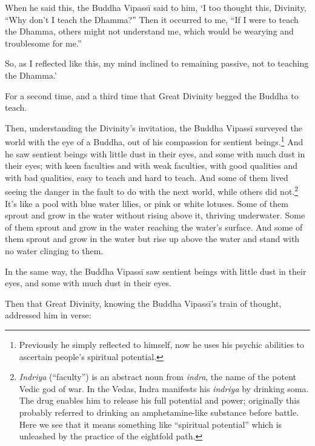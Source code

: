 \documentclass[12pt,openany]{book}%
\begin{document}
When he said this, the Buddha \textsanskrit{Vipassī} said to him, ‘I too thought this, Divinity, “Why don’t I teach the Dhamma?” Then it occurred to me, “If I were to teach the Dhamma, others might not understand me, which would be wearying and troublesome for me.” 

So, as I reflected like this, my mind inclined to remaining passive, not to teaching the Dhamma.’ 

For a second time, and a third time that Great Divinity begged the Buddha to teach. 

Then, understanding the Divinity’s invitation, the Buddha \textsanskrit{Vipassī} surveyed the world with the eye of a Buddha, out of his compassion for sentient beings.\footnote{Previously he simply reflected to himself, now he uses his psychic abilities to ascertain people’s spiritual potential. } And he saw sentient beings with little dust in their eyes, and some with much dust in their eyes; with keen faculties and with weak faculties, with good qualities and with bad qualities, easy to teach and hard to teach. And some of them lived seeing the danger in the fault to do with the next world, while others did not.\footnote{\textit{Indriya} (“faculty”) is an abstract noun from \textit{indra}, the name of the potent Vedic god of war. In the Vedas, Indra manifests his \textit{indriya} by drinking soma. The drug enables him to release his full potential and power; originally this probably referred to drinking an amphetamine-like substance before battle. Here we see that it means something like “spiritual potential” which is unleashed by the practice of the eightfold path. } It’s like a pool with blue water lilies, or pink or white lotuses. Some of them sprout and grow in the water without rising above it, thriving underwater. Some of them sprout and grow in the water reaching the water’s surface. And some of them sprout and grow in the water but rise up above the water and stand with no water clinging to them. 

In the same way, the Buddha \textsanskrit{Vipassī} saw sentient beings with little dust in their eyes, and some with much dust in their eyes. 

Then that Great Divinity, knowing the Buddha \textsanskrit{Vipassī}’s train of thought, addressed him in verse: 
\end{document}
